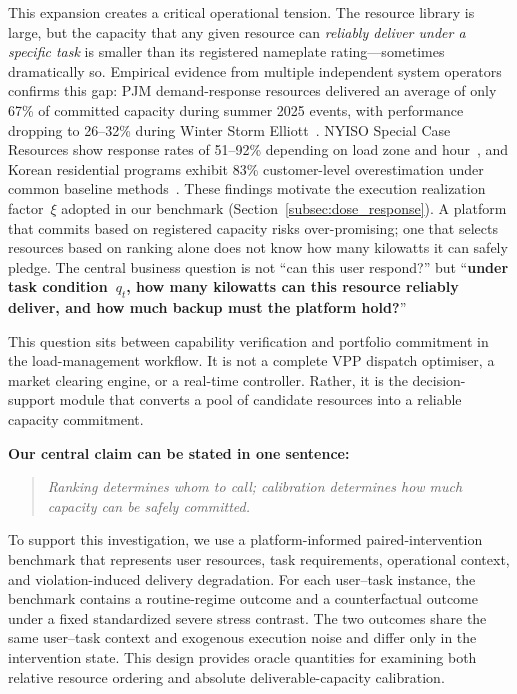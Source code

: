 \documentclass[utf8]{FrontiersinHarvard}
\begin{document}
This expansion creates a critical operational tension. The
resource library is large, but the capacity that any given
resource can \emph{reliably deliver under a specific task} is
smaller than its registered nameplate rating---sometimes
dramatically so. Empirical evidence from multiple independent
system operators confirms this gap: PJM demand-response
resources delivered an average of only 67\% of committed
capacity during summer 2025 events, with performance dropping
to 26--32\% during Winter Storm
Elliott~\citep{pjm2026marketmonitor,recurve2026elliott}.
NYISO Special Case Resources show response rates of
51--92\% depending on load zone and hour~\citep{nyiso2026scr},
and Korean residential programs exhibit 83\% customer-level
overestimation under common baseline
methods~\citep{kim2018freerider}. These findings motivate the
execution realization factor~$\xi$ adopted in our benchmark
(Section~\ref{subsec:dose_response}).
A platform that commits based on registered
capacity risks over-promising; one that selects resources based
on ranking alone does not know how many kilowatts it can safely
pledge. The central business question is not ``can this user
respond?'' but ``\textbf{under task condition~$q_t$, how many
kilowatts can this resource reliably deliver, and how much
backup must the platform hold?}''

This question sits between capability verification and portfolio
commitment in the load-management workflow. It is not a complete
VPP dispatch optimiser, a market clearing engine, or a real-time
controller. Rather, it is the decision-support module that
converts a pool of candidate resources into a reliable capacity
commitment.

\textbf{Our central claim can be stated in one sentence:}
\begin{quote}
\textit{Ranking determines whom to call; calibration determines
how much capacity can be safely committed.}
\end{quote}

To support this investigation, we use a platform-informed
paired-intervention benchmark that represents user resources,
task requirements, operational context, and violation-induced
delivery degradation. For each user--task instance, the benchmark
contains a routine-regime outcome and a counterfactual outcome
under a fixed standardized severe stress contrast. The two
outcomes share the same user--task context and exogenous execution
noise and differ only in the intervention state. This design
provides oracle quantities for examining both relative resource
ordering and absolute deliverable-capacity calibration.
\end{document}
